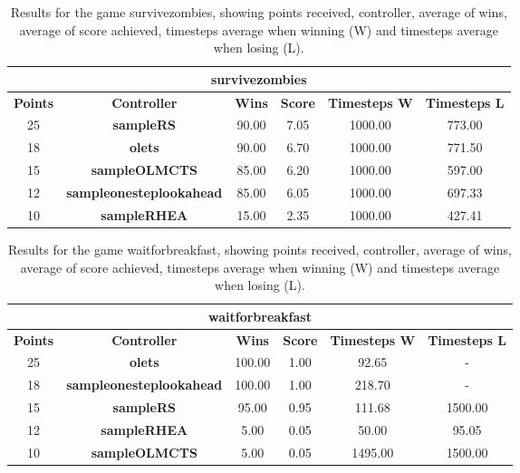 \begin{table*}[!t]
\begin{center}
\begin{tabular}{|c|c|c|c|c|c|}
\multicolumn{6}{c}{\textbf{survivezombies}}\\
\hline
\textbf{Points} & \textbf{Controller} & \textbf{Wins} &  \textbf{Score} & \textbf{Timesteps W} & \textbf{Timesteps L}\\
\hline
25 & \textbf{sampleRS} & 90.00 & 7.05 & 1000.00 & 773.00
 \\
\hline
18 & \textbf{olets} & 90.00 & 6.70 & 1000.00 & 771.50
 \\
\hline
15 & \textbf{sampleOLMCTS} & 85.00 & 6.20 & 1000.00 & 597.00
 \\
\hline
12 & \textbf{sampleonesteplookahead} & 85.00 & 6.05 & 1000.00 & 697.33
 \\
\hline
10 & \textbf{sampleRHEA} & 15.00 & 2.35 & 1000.00 & 427.41
 \\
\hline
\end{tabular}
\caption{Results for the game survivezombies, showing points received, controller, average of wins, average of score achieved, timesteps average when winning (W) and timesteps average when losing (L).}
\label{tab:weights}
\end{center}
\end{table*}
\begin{table*}[!t]
\begin{center}
\begin{tabular}{|c|c|c|c|c|c|}
\multicolumn{6}{c}{\textbf{waitforbreakfast}}\\
\hline
\textbf{Points} & \textbf{Controller} & \textbf{Wins} &  \textbf{Score} & \textbf{Timesteps W} & \textbf{Timesteps L}\\
\hline
25 & \textbf{olets} & 100.00 & 1.00 & 92.65 &  - 
 \\
\hline
18 & \textbf{sampleonesteplookahead} & 100.00 & 1.00 & 218.70 &  - 
 \\
\hline
15 & \textbf{sampleRS} & 95.00 & 0.95 & 111.68 & 1500.00
 \\
\hline
12 & \textbf{sampleRHEA} & 5.00 & 0.05 & 50.00 & 95.05
 \\
\hline
10 & \textbf{sampleOLMCTS} & 5.00 & 0.05 & 1495.00 & 1500.00
 \\
\hline
\end{tabular}
\caption{Results for the game waitforbreakfast, showing points received, controller, average of wins, average of score achieved, timesteps average when winning (W) and timesteps average when losing (L).}
\label{tab:weights}
\end{center}
\end{table*}

